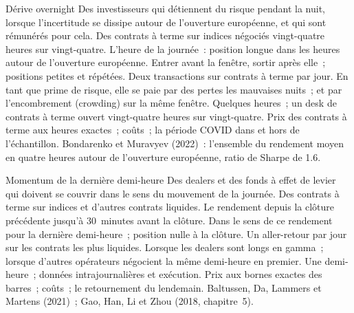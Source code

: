 \begin{strategyfile}{Dérive overnight}\label{strat:s1:intraday-patterns:overnight}
 Des investisseurs qui détiennent du risque pendant la nuit, lorsque l'incertitude se dissipe autour de l'ouverture européenne, et qui sont rémunérés pour cela.
 Des contrats à terme sur indices négociés vingt-quatre heures sur vingt-quatre.
 L'heure de la journée~: position longue dans les heures autour de l'ouverture européenne.
 Entrer avant la fenêtre, sortir après elle~; positions petites et répétées.
 Deux transactions sur contrats à terme par jour.
 En tant que prime de risque, elle se paie par des pertes les mauvaises nuits~; et par l'encombrement (crowding) sur la même fenêtre.
 Quelques heures~; un desk de contrats à terme ouvert vingt-quatre heures sur vingt-quatre.
 Prix des contrats à terme aux heures exactes~; coûts~; la période COVID dans et hors de l'échantillon.
 Bondarenko et Muravyev (2022)~: l'ensemble du rendement moyen en quatre heures autour de l'ouverture européenne, ratio de Sharpe de 1.6.
\end{strategyfile}

\begin{strategyfile}{Momentum de la dernière demi-heure}\label{strat:s1:intraday-patterns:lasthalf}
 Des dealers et des fonds à effet de levier qui doivent se couvrir dans le sens du mouvement de la journée.
 Des contrats à terme sur indices et d'autres contrats liquides.
 Le rendement depuis la clôture précédente jusqu'à 30~minutes avant la clôture.
 Dans le sens de ce rendement pour la dernière demi-heure~; position nulle à la clôture.
 Un aller-retour par jour sur les contrats les plus liquides.
 Lorsque les dealers sont longs en gamma~; lorsque d'autres opérateurs négocient la même demi-heure en premier.
 Une demi-heure~; données intrajournalières et exécution.
 Prix aux bornes exactes des barres~; coûts~; le retournement du lendemain.
 Baltussen, Da, Lammers et Martens (2021)~; Gao, Han, Li et Zhou (2018, chapitre~5).
\end{strategyfile}

